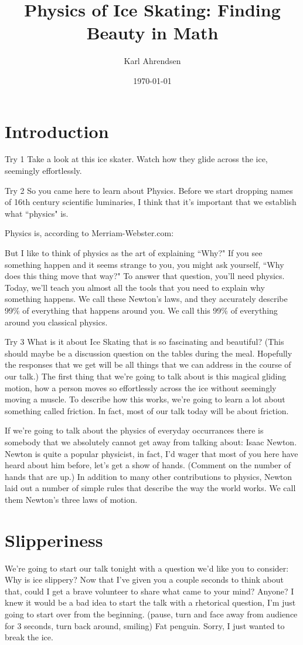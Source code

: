\documentclass[12pt]{article}
\title{Physics of Ice Skating: Finding Beauty in Math}
\author{Karl Ahrendsen}
\date{\today}
\begin{document}
\maketitle
\section{Introduction}
Try 1
Take a look at this ice skater. Watch how they glide across the ice, seemingly effortlessly.




Try 2
So you came here to learn about Physics. Before we start dropping names of 16th century
scientific luminaries, I think that it's important that we establish what ``physics" is.

Physics is, according to Merriam-Webster.com:

But I like to think of physics as the art of explaining ``Why?" If you see something 
happen and it seems strange to you, you might ask yourself, ``Why does this thing move 
that way?" To answer that question, you'll need physics. Today, we'll teach you almost
all the tools that you need to explain why something happens. We call these Newton's 
laws, and they accurately describe 99\% of everything that happens around you. We call
this 99\% of everything around you classical physics. 




Try 3
What is it about Ice Skating that is so fascinating and beautiful? (This should maybe be
a discussion question on the tables during the meal. Hopefully the responses that we
get will be all things that we can address in the course of our talk.) The first thing
that we're going to talk about is this magical gliding motion, how a person moves
so effortlessly across the ice without seemingly moving a muscle. To describe how this
works, we're going to learn a lot about something called friction. In fact, most of our
talk today will be about friction. 

If we're going to talk about the physics of everyday occurrances there is somebody 
that we absolutely cannot get away from talking about: Isaac Newton. Newton is quite a
popular physicist, in fact, I'd wager that most of you here have heard about him before,
let's get a show of hands. (Comment on the number of hands that are up.) In addition to
many other contributions to physics, Newton laid out a number of simple rules that 
describe the way the world works. We call them Newton's three laws of motion.

\section{Slipperiness}
We're going to start our talk tonight with a question we'd like you to consider:
Why is ice slippery? Now that I've given you a couple seconds to think about that, 
could I get a brave volunteer to share what came to your mind? Anyone? I knew it would
be a bad idea to start the talk with a rhetorical question, I'm just going to start 
over from the beginning. (pause, turn and face away from audience for 3 seconds, 
turn back around, smiling) Fat penguin. Sorry, I just wanted to break the ice. 
    
\end{document}

